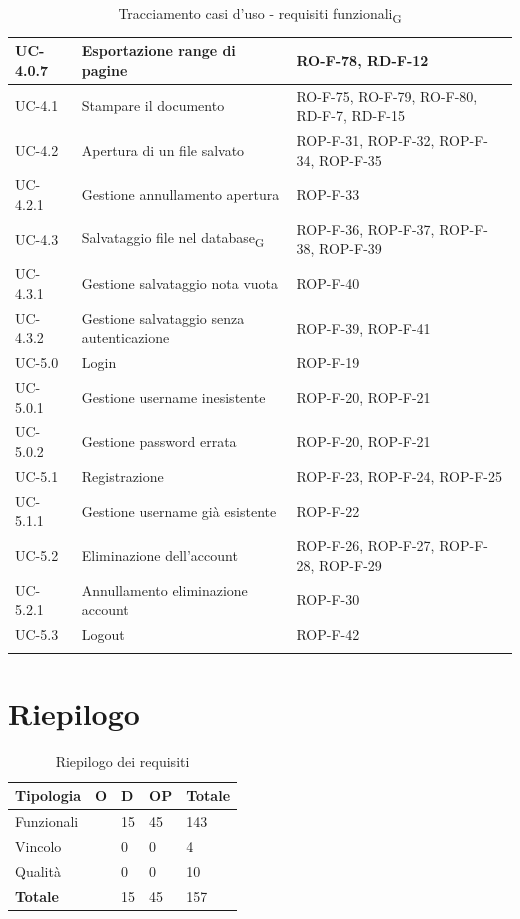 \documentclass[11pt,a4paper]{article}
\newcommand{\gls}[1]{#1\textsubscript{G}}
\begin{document}
\begin{longtable}{|p{}|p{}|>{\raggedright\arraybackslash}p{}|}
\hline
UC-4.0.7 & Esportazione range di pagine & RO-F-78, RD-F-12 \\
\hline
UC-4.1 & Stampare il documento & RO-F-75, RO-F-79, RO-F-80, RD-F-7, RD-F-15 \\
\hline
UC-4.2 & Apertura di un file salvato & ROP-F-31, ROP-F-32, ROP-F-34, ROP-F-35 \\
\hline
UC-4.2.1 & Gestione annullamento apertura & ROP-F-33 \\
\hline
UC-4.3 & Salvataggio file nel \gls{database} & ROP-F-36, ROP-F-37, ROP-F-38, ROP-F-39 \\
\hline
UC-4.3.1 & Gestione salvataggio nota vuota & ROP-F-40 \\
\hline
UC-4.3.2 & Gestione salvataggio senza autenticazione & ROP-F-39, ROP-F-41 \\
\hline
UC-5.0 & Login & ROP-F-19 \\
\hline
UC-5.0.1 & Gestione username inesistente & ROP-F-20, ROP-F-21 \\
\hline
UC-5.0.2 & Gestione password errata & ROP-F-20, ROP-F-21 \\
\hline
UC-5.1 & Registrazione & ROP-F-23, ROP-F-24, ROP-F-25 \\
\hline
UC-5.1.1 & Gestione username già esistente & ROP-F-22 \\
\hline
UC-5.2 & Eliminazione dell'account & ROP-F-26, ROP-F-27, ROP-F-28, ROP-F-29 \\
\hline
UC-5.2.1 & Annullamento eliminazione account & ROP-F-30 \\
\hline
UC-5.3 & Logout & ROP-F-42 \\
\hline
\addlinespace[1em]
\caption{Tracciamento casi d'uso - \gls{requisiti funzionali}}
\end{longtable}

\newpage

\section{Riepilogo}
\begin{table}[H]
\centering
\begin{tabular}{|p{}|>{\raggedright\arraybackslash}p{}|p{}|p{}|p{}|}
\hline
\textbf{Tipologia} & \textbf{O} & \textbf{D} & \textbf{OP} & \textbf{Totale}\\
\hline
Funzionali & 83 & 15 & 45 & 143 \\
\hline
Vincolo & 4 & 0 & 0 & 4 \\
\hline
Qualità & 10 & 0 & 0 & 10 \\
\hline
\textbf{Totale} & 97 & 15 & 45 & 157 \\
\hline
\end{tabular}
\caption{Riepilogo dei requisiti}
\end{table}
\end{document}
